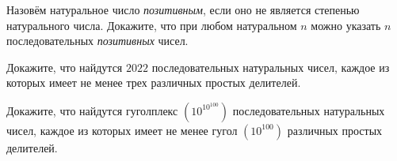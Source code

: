 \documentclass{article}
\begin{document}
\begin{enumerate_boxed}
        \item Назовём натуральное число \textit{позитивным}, если оно не является степенью натурального числа.
        Докажите, что при любом натуральном $n$ можно указать $n$ последовательных \textit{позитивных} чисел.

        \item Докажите, что найдутся $2022$ последовательных натуральных чисел, каждое из которых имеет не менее трех различных простых делителей.

        \item Докажите, что найдутся гуголплекс $\left(10^{10^{100}}\right) $ последовательных натуральных чисел, каждое из которых имеет не менее гугол $\left(10^{100}\right)$ различных простых делителей.

    \end{enumerate_boxed}
\end{document}
